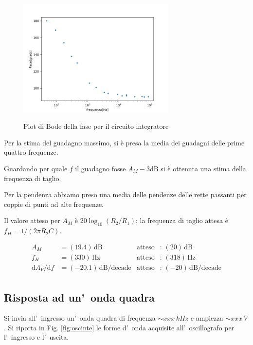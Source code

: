 \documentclass[10pt,a4paper]{article}
\begin{document}
         \begin{figure}[h]
                                       
		\begin{center}
			\includegraphics[width=0.7\textwidth]{fase}
			 \label{fig:fase}
		\end{center}
		\caption{\small Plot di Bode della fase per il circuito integratore}
		
	\end{figure}
	 
	Per la stima del guadagno massimo, si è presa la media dei guadagni delle prime quattro frequenze.


	Guardando per quale $f$ il guadagno fosse  $A_M - 3 $dB si è ottenuta una stima della frequenza di taglio.

	Per la pendenza abbiamo preso una media delle pendenze delle rette passanti per coppie di punti ad alte frequenze.

	Il valore atteso per $A_M $ è $ 20 \log_{10}(R_2/R_1)$; la frequenza di taglio attesa è $f_H = 1/(2\pi R_2 C)$.

	
	\begin{align*}
	A_M &= (19.4 )\,\mathrm{dB} & \mathrm{atteso} &:\,(20  )\, \mathrm{dB}  \\
	f_H &= (330 )\,\mathrm{Hz} & \mathrm{atteso} &:\,(318  )\, \mathrm{Hz} \\
	{\mathrm{d}A_V}/{\mathrm{d}f} &= (-20.1 )\,\mathrm{dB/decade} & \mathrm{atteso} &:\,(-20  )\, \mathrm{dB/decade}  \\
	\end{align*}
	
	
	\subsection*{Risposta ad un'~onda quadra}
	Si invia all'~ingresso un'~onda quadra di frequenza $\sim xxx\,kHz$ e ampiezza $\sim xxx\,V$.
	Si riporta in Fig. \ref{fig:oscinte} le forme d'~onda acquisite all'~oscillografo per l'~ingresso
	e l'~uscita. 
	
\end{document}
